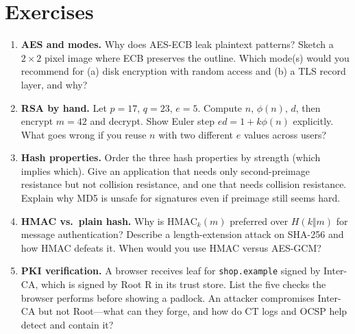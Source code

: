 \section{Exercises}
\label{sec:ch02-exercises}
\begin{enumerate}[label=E2.\arabic*, leftmargin=*, itemsep=0.8em]
    \item \textbf{AES and modes.} Why does AES-ECB leak plaintext patterns? Sketch a $2\times2$ pixel image where ECB preserves the outline. Which mode(s) would you recommend for (a) disk encryption with random access and (b) a TLS record layer, and why?
    \item \textbf{RSA by hand.} Let $p=17$, $q=23$, $e=5$. Compute $n$, $\phi(n)$, $d$, then encrypt $m=42$ and decrypt. Show Euler step $ed=1+k\phi(n)$ explicitly. What goes wrong if you reuse $n$ with two different $e$ values across users?
    \item \textbf{Hash properties.} Order the three hash properties by strength (which implies which). Give an application that needs only second-preimage resistance but not collision resistance, and one that needs collision resistance. Explain why MD5 is unsafe for signatures even if preimage still seems hard.
    \item \textbf{HMAC vs.\ plain hash.} Why is $\text{HMAC}_k(m)$ preferred over $H(k\Vert m)$ for message authentication? Describe a length-extension attack on SHA-256 and how HMAC defeats it. When would you use HMAC versus AES-GCM?
    \item \textbf{PKI verification.} A browser receives leaf for \texttt{shop.example} signed by Inter-CA, which is signed by Root R in its trust store. List the five checks the browser performs before showing a padlock. An attacker compromises Inter-CA but not Root---what can they forge, and how do CT logs and OCSP help detect and contain it?
\end{enumerate}

